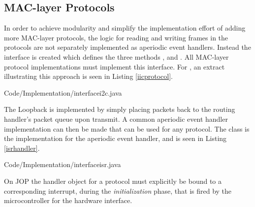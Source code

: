 \subsection{MAC-layer Protocols} %
\label{sub:mac_layer_protocols}
In order to achieve modularity and simplify the implementation effort of adding more MAC-layer protocols, the logic for reading and writing frames in the protocols are not separately implemented as aperiodic event handlers. Instead the interface  is created which defines the three methods ,  and . All MAC-layer protocol implementations must implement this interface. For \iic, an extract illustrating this approach is seen in Listing \ref{iicprotocol}.


{Code/Implementation/interfacei2c.java}

The Loopback is implemented by simply placing packets back to the routing handler's packet queue upon transmit. A common aperiodic event handler implementation can then be made that can be used for any protocol. The class  is the implementation for the aperiodic event handler, and is seen in Listing \ref{isrhandler}.

{Code/Implementation/interfaceisr.java}

On JOP the handler object for a protocol must explicitly be bound to a corresponding interrupt, during the \textit{initialization} phase, that is fired by the microcontroller for the hardware interface.

